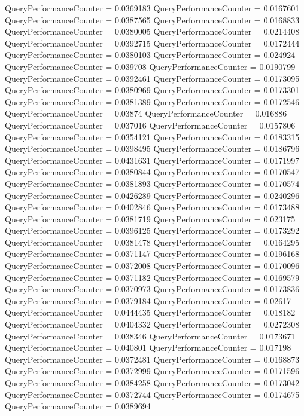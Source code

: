 \documentclass[9pt]{article}
\theoremstyle{plain}
\theoremstyle{definition}
\theoremstyle{remark}
\numberwithin{equation}{section}
\begin{document}
QueryPerformanceCounter  =  0.0369183
QueryPerformanceCounter  =  0.0167601
QueryPerformanceCounter  =  0.0387565
QueryPerformanceCounter  =  0.0168833
QueryPerformanceCounter  =  0.0380005
QueryPerformanceCounter  =  0.0214408
QueryPerformanceCounter  =  0.0392715
QueryPerformanceCounter  =  0.0172444
QueryPerformanceCounter  =  0.0380103
QueryPerformanceCounter  =  0.024924
QueryPerformanceCounter  =  0.039708
QueryPerformanceCounter  =  0.0190799
QueryPerformanceCounter  =  0.0392461
QueryPerformanceCounter  =  0.0173095
QueryPerformanceCounter  =  0.0380969
QueryPerformanceCounter  =  0.0173301
QueryPerformanceCounter  =  0.0381389
QueryPerformanceCounter  =  0.0172546
QueryPerformanceCounter  =  0.03874
QueryPerformanceCounter  =  0.016886
QueryPerformanceCounter  =  0.037016
QueryPerformanceCounter  =  0.0157806
QueryPerformanceCounter  =  0.0354121
QueryPerformanceCounter  =  0.0183315
QueryPerformanceCounter  =  0.0398495
QueryPerformanceCounter  =  0.0186796
QueryPerformanceCounter  =  0.0431631
QueryPerformanceCounter  =  0.0171997
QueryPerformanceCounter  =  0.0380844
QueryPerformanceCounter  =  0.0170547
QueryPerformanceCounter  =  0.0381893
QueryPerformanceCounter  =  0.0170574
QueryPerformanceCounter  =  0.0426289
QueryPerformanceCounter  =  0.0240296
QueryPerformanceCounter  =  0.0402846
QueryPerformanceCounter  =  0.0173488
QueryPerformanceCounter  =  0.0381719
QueryPerformanceCounter  =  0.023175
QueryPerformanceCounter  =  0.0396125
QueryPerformanceCounter  =  0.0173292
QueryPerformanceCounter  =  0.0381478
QueryPerformanceCounter  =  0.0164295
QueryPerformanceCounter  =  0.0371147
QueryPerformanceCounter  =  0.0196168
QueryPerformanceCounter  =  0.0372008
QueryPerformanceCounter  =  0.0170096
QueryPerformanceCounter  =  0.0371182
QueryPerformanceCounter  =  0.0169579
QueryPerformanceCounter  =  0.0370973
QueryPerformanceCounter  =  0.0173836
QueryPerformanceCounter  =  0.0379184
QueryPerformanceCounter  =  0.02617
QueryPerformanceCounter  =  0.0444435
QueryPerformanceCounter  =  0.018182
QueryPerformanceCounter  =  0.0404332
QueryPerformanceCounter  =  0.0272308
QueryPerformanceCounter  =  0.038346
QueryPerformanceCounter  =  0.0173671
QueryPerformanceCounter  =  0.040801
QueryPerformanceCounter  =  0.017198
QueryPerformanceCounter  =  0.0372481
QueryPerformanceCounter  =  0.0168873
QueryPerformanceCounter  =  0.0372999
QueryPerformanceCounter  =  0.0171596
QueryPerformanceCounter  =  0.0384258
QueryPerformanceCounter  =  0.0173042
QueryPerformanceCounter  =  0.0372744
QueryPerformanceCounter  =  0.0174675
QueryPerformanceCounter  =  0.0389694
\end{document}
